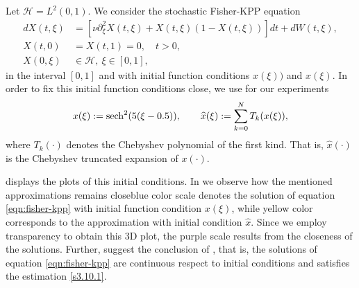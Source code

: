     Let $\mathcal{H} = L^2 (0,1)$. We consider the stochastic
Fisher-KPP equation 
    \begin{equation}
        \label{eqn:fisher-kpp}
        \begin{aligned}
            d X(t, \xi) &= 
                \left[
                    \nu 
                    \partial_{\xi} ^ 2 X(t, \xi)
                    +
                    X(t, \xi) (1 -X(t, \xi) )
                \right]
                dt
                +
                dW(t, \xi),
            \\
            X(t, 0) &= X(t, 1) =0, \quad t>0, 
            \\
            X(0, \xi) & \in 
            \mathcal{H}, \ \xi \in [0, 1],
        \end{aligned}
    \end{equation}
    in the interval $[0, 1]$ and with initial function 
    conditions
    $x(\xi))$ and  $\widehat{x}(\xi)$. In order to fix this 
    initial function 
    conditions  close, we use for our experiments
    \begin{equation}
        x(\xi) := \operatorname{sech} ^ 2( 5  (\xi - 0.5)),
        \qquad
        \widehat{x}(\xi) :=
            \sum_{k=0} ^ N
             T_k(x(\xi)),
    \end{equation}
    where $T_k(\cdot)$ denotes the Chebyshev polynomial of the first kind. That 
    is, $\widehat{x}(\cdot)$ is the Chebyshev truncated expansion of $x(\cdot)$.
    
     displays the 
    plots of this initial conditions. In  we 
    observe how the mentioned approximations remains close\textemdash blue
    color scale denotes the solution of equation \ref{eqn:fisher-kpp}
    with initial function condition $x(\xi)$, while yellow color corresponds 
    to the approximation with initial condition $\widehat{x}$. Since we employ
    transparency to obtain this 3D plot, the  purple scale results from the 
    closeness of the solutions. Further,   suggest the 
    conclusion of , that is, the solutions of equation
    \eqref{eqn:fisher-kpp} are continuous respect to initial conditions and 
    satisfies the estimation \eqref{s3.10.1}.

